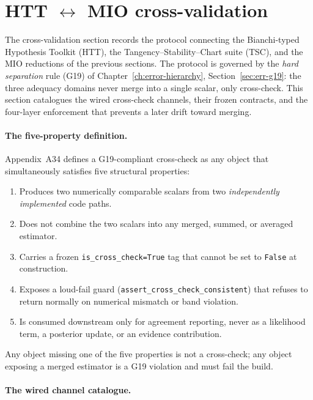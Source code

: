 \section{HTT $\leftrightarrow$ MIO cross-validation}
\label{sec:mio-htt-crosscheck}

The cross-validation section records the protocol connecting
the Bianchi-typed Hypothesis Toolkit (HTT), the
Tangency--Stability--Chart suite (TSC), and the MIO reductions
of the previous sections.  The protocol is governed by the
\emph{hard separation} rule (G19) of
Chapter~\ref{ch:error-hierarchy},
Section~\ref{sec:err-g19}: the three adequacy domains never
merge into a single scalar, only cross-check.  This section
catalogues the wired cross-check channels, their frozen
contracts, and the four-layer enforcement that prevents a
later drift toward merging.

\paragraph{The five-property definition.}

Appendix~A34 defines a G19-compliant cross-check as any
object that simultaneously satisfies five structural
properties:

\begin{enumerate}
\item Produces two numerically comparable scalars from two
  \emph{independently implemented} code paths.
\item Does not combine the two scalars into any merged,
  summed, or averaged estimator.
\item Carries a frozen \texttt{is\_cross\_check=True} tag
  that cannot be set to \texttt{False} at construction.
\item Exposes a loud-fail guard
  (\texttt{assert\_cross\_check\_consistent}) that refuses
  to return normally on numerical mismatch or band
  violation.
\item Is consumed downstream only for agreement reporting,
  never as a likelihood term, a posterior update, or an
  evidence contribution.
\end{enumerate}

Any object missing one of the five properties is not a
cross-check; any object exposing a merged estimator is a
G19 violation and must fail the build.

\paragraph{The wired channel catalogue.}

